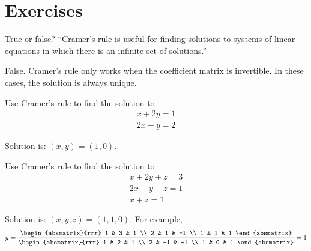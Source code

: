 \section*{Exercises}

\begin{ex}
  True or false? ``Cramer's rule is useful for finding solutions
    to systems of linear equations in which there is an infinite set
    of solutions.''
  \begin{sol}
    False. Cramer's rule only works when the coefficient matrix is
    invertible. In these cases, the solution is always unique.
  \end{sol}
\end{ex}

\begin{ex}
  Use Cramer's rule to find the solution to
  \begin{equation*}
    \begin{array}{c}
      x+2y=1 \\
      2x-y=2
    \end{array}
  \end{equation*}
  \begin{sol}
    Solution is: $(x,y) = (1,0)$.
  \end{sol}
\end{ex}

\begin{ex}
  Use Cramer's rule to find the solution to
  \begin{equation*}
    \begin{array}{c}
      x+2y+z=3 \\
      2x-y-z=1 \\
      x+z=1
    \end{array}
  \end{equation*}
  \begin{sol}
    Solution is: $(x,y,z) = (1,1,0)$. For example,
    \begin{equation*}
      y=\frac{\begin{absmatrix}{rrr}
          1 & 3 & 1 \\
          2 & 1 & -1 \\
          1 & 1 & 1
        \end{absmatrix}}{\begin{absmatrix}{rrr}
          1 & 2 & 1 \\
          2 & -1 & -1 \\
          1 & 0 & 1
        \end{absmatrix}}=1
    \end{equation*}
  \end{sol}
\end{ex}

